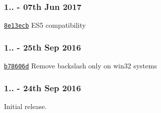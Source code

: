 \subsubsection*{1.. -\/ 07th Jun 2017}


\begin{DoxyItemize}
\item \href{https://github.com/darsain/remove-trailing-separator/commit/8e13ecbfd7b9f5fdf97c5d5ff923e4718b874e31}{\tt 8e13ecb} E\+S5 compatibility
\end{DoxyItemize}

\subsubsection*{1.. -\/ 25th Sep 2016}


\begin{DoxyItemize}
\item \href{https://github.com/darsain/remove-trailing-separator/commit/af90b4e153a4527894741af6c7005acaeb78606d}{\tt b78606d} Remove backslash only on win32 systems
\end{DoxyItemize}

\subsubsection*{1.. -\/ 24th Sep 2016}

Initial release. 